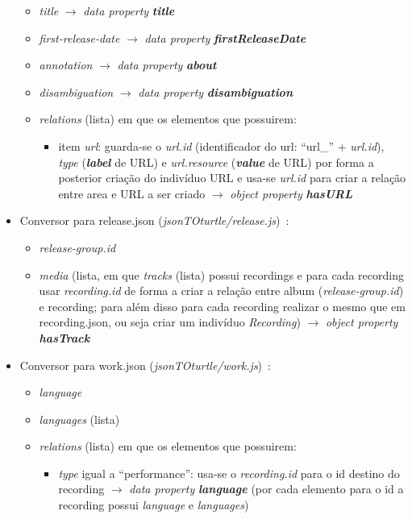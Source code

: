 \documentclass{article}
\begin{document}
\begin{itemize}
\begin{itemize}
            \item \textit{title} $\to$ \textit{data property} \textit{\textbf{title}}
            \item \textit{first-release-date} $\to$ \textit{data property} \textit{\textbf{firstReleaseDate}}
            \item \textit{annotation} $\to$ \textit{data property} \textit{\textbf{about}}
            \item \textit{disambiguation} $\to$ \textit{data property} \textit{\textbf{disambiguation}}
            \item \textit{relations} (lista) em que os elementos que possuirem:
                \begin{itemize}
                    \item item \textit{url}: guarda-se o \textit{url.id} (identificador do url: ``url\_'' + \textit{url.id}), \textit{type} (\textit{\textbf{label}} de URL) e \textit{url.resource} (\textit{\textbf{value}} de URL) por forma a posterior criação do indivíduo URL e usa-se \textit{url.id} para criar a relação entre area e URL a ser criado $\to$ \textit{object property} \textit{\textbf{hasURL}}
                \end{itemize}
        \end{itemize}
    \item Conversor para release.json (\textit{jsonTOturtle/release.js})~\cite{mbRe}:
        \begin{itemize}
            \item \textit{release-group.id}
            \item \textit{media} (lista, em que \textit{tracks} (lista) possui recordings e para cada recording usar \textit{recording.id} de forma a criar a relação entre album (\textit{release-group.id}) e recording; para além disso para cada recording realizar o mesmo que em recording.json, ou seja criar um indivíduo \textit{Recording}) $\to$ \textit{object property} \textit{\textbf{hasTrack}}
        \end{itemize}
    \item Conversor para work.json (\textit{jsonTOturtle/work.js})~\cite{mbWo}:
        \begin{itemize}
            \item \textit{language}
            \item \textit{languages} (lista)
            \item \textit{relations} (lista) em que os elementos que possuirem:
                \begin{itemize}
                    \item \textit{type} igual a ``performance'': usa-se o \textit{recording.id} para o id destino do recording $\to$ \textit{data property} \textit{\textbf{language}} (por cada elemento para o id a recording possui \textit{language} e \textit{languages})
                \end{itemize}
        \end{itemize}
\end{itemize}
\end{document}
